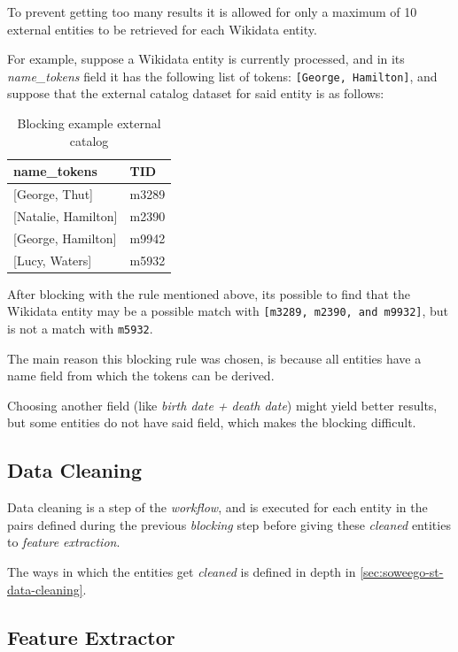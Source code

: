\documentclass[epsfig,a4paper,11pt,titlepage,twoside,openany]{book}
\begin{document}
To prevent getting too many results it is allowed for only a maximum of 10 external entities to be retrieved for each Wikidata entity.

For example, suppose a Wikidata entity is currently processed, and in its \textit{name\_tokens} field it has the following list of tokens: \texttt{[George, Hamilton]}, and suppose that the external catalog dataset for said entity is as follows:

\begin{table}[H]
\centering
\begin{tabular}{l|l}
name\_tokens        & TID   \\ \hline
{[George, Thut]}      & m3289 \\
{[Natalie, Hamilton]} & m2390 \\
{[George, Hamilton]}  & m9942 \\
{[Lucy, Waters]}      & m5932
\end{tabular}
\caption{Blocking example external catalog}
\label{tab:soweego-blocking-ex}
\end{table}

After blocking with the rule mentioned above, its possible to find that the Wikidata entity may be a possible match with \texttt{[m3289, m2390, and m9932]}, but is not a match with \texttt{m5932}.

The main reason this blocking rule was chosen, is because all entities have a name field from which the tokens can be derived.  

Choosing another field (like \textit{birth date + death date}) might yield better results, but some entities do not have said field, which makes the blocking difficult. 

\subsection{Data Cleaning}
\label{sec:soweego-st-data-cleaning}

Data cleaning is a step of the \textit{workflow}, and is executed for each entity in the pairs defined during the previous \textit{blocking} step before giving these \textit{cleaned} entities to \textit{feature extraction}. 

The ways in which the entities get \textit{cleaned} is defined in depth in \autoref{sec:soweego-st-data-cleaning}. 


\subsection{Feature Extractor}
\label{sec:soweego-st-feature-ext}
\end{document}
